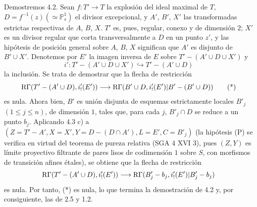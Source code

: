 Demostremos 4.2. Sean $f:T'\to T$ la explosión del ideal maximal de $T$, $D=f^{-1}(z)(\simeq\mathbb P^1_s)$ el divisor excepcional, y $A'$, $B'$, $X'$ las transformadas estrictas respectivas de $A$, $B$, $X$. $T'$ es, pues, regular, conexo y de dimensión $2$; $X'$ es un divisor regular que corta transversalmente a $D$ en un punto $z'$, y las hipótesis de posición general sobre $A$, $B$, $X$ significan que $A'$ es disjunto de $B'\cup X'$. Denotemos por $E'$ la imagen inversa de $E$ sobre $T'-(A'\cup D\cup X')$ y
\[
i':T'-(A'\cup D\cup X')\hookrightarrow T'-(A'\cup D)
\]
la inclusión. Se trata de demostrar que la flecha de restricción
\begin{equation}
\mathrm{R}\Gamma(T'-(A'\cup D),i'_!(E'))
\longrightarrow
\mathrm{R}\Gamma(B'\cup D,i'_!(E')|B'-(B'\cup D))
\tag{*}
\end{equation}
es nula. Ahora bien, $B'$ es unión disjunta de esquemas estrictamente locales $B'_j$ $(1\le j\le n)$, de dimensión $1$, tales que, para cada $j$, $B'_j\cap D$ se reduce a un punto $b_j$. Aplicando 4.3 c) a $(Z=T'-A', X=X', Y=D-(D\cap A'), L=E', C=B'_j)$ (la hipótesis (P) se verifica en virtud del teorema de pureza relativa (SGA 4 XVI 3), pues $(Z,Y)$ es límite proyectivo filtrante de pares lisos de codimensión $1$ sobre $S$, con morfismos de transición afines étales), se obtiene que la flecha de restricción
\[
\mathrm{R}\Gamma(T'-(A'\cup D),i'_!(E'))
\longrightarrow
\mathrm{R}\Gamma(B'_j-b_j,i'_!(E')|B'_j-b_j)
\]
es nula. Por tanto, (*) es nula, lo que termina la demostración de 4.2 y, por consiguiente, las de 2.5 y 1.2.
